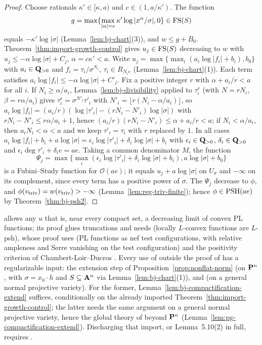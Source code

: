 \begin{proof}
Choose rationals $\kappa'\in[\kappa,a)$ and $c\in(1,a/\kappa')$. The function
\[
 g=\max\{\max_{|\alpha|=e}\kappa'\log|x^\alpha/\sigma|,0\}\in\mathrm{FS}(S)
\]
equals $-\kappa'\log|\sigma|$
(Lemma~\ref{lem:bj-chart}(3)), and $w\le g+B_0$. Theorem~\ref{thm:import-growth-control} gives $u_j\in\mathrm{FS}(S)$
decreasing to $w$ with $u_j\le-\alpha\log|\sigma|+C_j$, $\alpha=c\kappa'<a$. Write
$u_j=\max\{\max_i(a_i\log|f_i|+b_i),b_0\}$ with $a_i\in\mathbf{Q}_{>0}$ and $f_i=\tau_i/\sigma^{N_i}$, $\tau_i\in R_{N_ie}$
(Lemma~\ref{lem:bj-chart}(1)). Each term satisfies $a_i\log|f_i|\le-\alpha\log|\sigma|+C'_j$. Fix a positive integer
$r$ with $\alpha+a_i/r<a$ for all $i$. If $N_i\ge\alpha/a_i$, Lemma~\ref{lem:bj-divisibility} applied to $\tau_i^r$
(with $N=rN_i$, $\beta=r\alpha/a_i$) gives $\tau_i^r=\sigma^{N'_i}\tau'_i$ with $N'_i=\lfloor r(N_i-\alpha/a_i)\rfloor$, so
$a_i\log|f_i|=(a_i/r)(\log|\tau'_i|-(rN_i-N'_i)\log|\sigma|)$ with $rN_i-N'_i\le r\alpha/a_i+1$, hence
$(a_i/r)(rN_i-N'_i)\le\alpha+a_i/r<a$; if $N_i<\alpha/a_i$, then $a_iN_i<\alpha<a$ and we keep $\tau'_i=\tau_i$ with
$r$ replaced by $1$. In all cases
$a_i\log|f_i|+b_i+a\log|\sigma|=\epsilon_i\log|\tau'_i|+\delta_i\log|\sigma|+b_i$ with $\epsilon_i\in\mathbf{Q}_{>0}$, $\delta_i\in\mathbf{Q}_{>0}$ and
$\epsilon_i\deg\tau'_i+\delta_ie=ae$. Taking a common denominator $M$, the function
\[
 \Psi_j=\max\{\max_i(\epsilon_i\log|\tau'_i|+\delta_i\log|\sigma|+b_i),a\log|\sigma|+b_0\}
\]
is a Fubini--Study function for
$\mathcal O(ae)$; it equals $u_j+a\log|\sigma|$ on $U_\sigma$ and $-\infty$ on its complement, since every term has a
positive power of $\sigma$. The $\Psi_j$ decrease to $\phi$, and $\phi(v_{\mathrm{triv}})=w(v_{\mathrm{triv}})>-\infty$
(Lemma~\ref{lem:reg-triv-finite}); hence $\phi\in\operatorname{PSH}(ae)$ by Theorem~\ref{thm:bj-psh2}.
\end{proof}

\begin{remark}\label{rmk:bj-compactification-full}
\cite[Lemma~5.10(2)]{FHX} allows any $u$ that is, near every compact set, a decreasing limit of convex PL functions;
its proof glues truncations and needs \cite[Lemma~5.5]{FHX} (locally $L$-convex functions are $L$-psh), whose proof
uses \cite[Theorem~2.31, Definition~3.2, Lemma~4.3]{BJ22} (PL functions as nef test configurations, with relative
ampleness and Serre vanishing on the test configuration) and the positivity criterion of Chambert-Loir--Ducros
\cite{CLD12}. Every use of \cite[Lemma~5.10(2)]{FHX} outside the proof of \cite[Lemma~5.11(5),(6)]{FHX} has a
regularizable input: the extension step of Proposition~\ref{prop:nonflat-norm} (on $\mathbf{P}^n$, with
$\sigma=x_0\cdot h$ and $S\subseteq\mathbf{A}^n$ via Lemma~\ref{lem:bj-chart}(1)), and \cite[Corollary~5.26]{FHX} (on a general
normal projective variety). For the former, Lemma~\ref{lem:bj-compactification-extend} suffices, conditionally on the
already imported Theorem~\ref{thm:import-growth-control}; the latter needs the same argument on a general normal
projective variety, hence the global theory of \cite{BJ22} beyond $\mathbf{P}^n$ (Lemma~\ref{lem:pg-compactification-extend}). Discharging that import, or Lemma~5.10(2) in full, requires
\cite[Lemma~5.5]{FHX}.
\end{remark}
